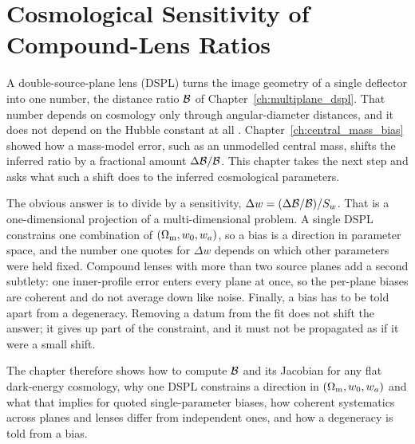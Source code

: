 
\chapter{Cosmological Sensitivity of Compound-Lens Ratios}
\label{ch:cosmological_sensitivity}

\noindent
A double-source-plane lens (DSPL) turns the image geometry of a single
deflector into one number, the distance ratio $\mathcal{B}$ of
Chapter~\ref{ch:multiplane_dspl}. That number depends on cosmology only
through angular-diameter distances, and it does not depend on the Hubble
constant at all \citep{collett_2012}. Chapter~\ref{ch:central_mass_bias}
showed how a mass-model error, such as an unmodelled central mass, shifts
the inferred ratio by a fractional amount $\Delta\mathcal{B}/\mathcal{B}$. This
chapter takes the next step and asks what such a shift does to the
inferred cosmological parameters.

The obvious answer is to divide by a sensitivity,
$\Delta w=(\Delta\mathcal{B}/\mathcal{B})/S_w$. That is a one-dimensional projection
of a multi-dimensional problem. A single DSPL constrains one combination
of $(\Omega_{\mathrm{m}},w_0,w_a)$, so a bias is a direction in parameter
space, and the number one quotes for $\Delta w$ depends on which other
parameters were held fixed. Compound lenses with more than two source
planes add a second subtlety: one inner-profile error enters every plane
at once, so the per-plane biases are coherent and do not average
down like noise. Finally, a bias has to be told apart from a
degeneracy. Removing a datum from the fit does not shift the
answer; it gives up part of the constraint, and it must not be
propagated as if it were a small shift.

The chapter therefore shows how to compute $\mathcal{B}$ and its Jacobian for
any flat dark-energy cosmology, why one DSPL constrains a direction in
$(\Omega_{\mathrm{m}},w_0,w_a)$ and what that implies for quoted single-parameter
biases, how coherent systematics across planes and lenses differ from
independent ones, and how a degeneracy is told from a bias.

